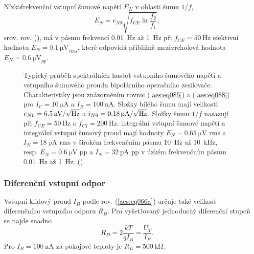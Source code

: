         Nízkofrekvenční vstupní šumové napětí \(E_N\) v oblasti šumu \(1/f\),
        \begin{equation}\label{aes:eq087}
          E_N = e_{N0}\sqrt{f_{CE}\ln{\dfrac{f_2}{f_1}}},
        \end{equation}
        srov. rov. (), má v pásmu frekvencí \SI{0.01}{\Hz} až \SI{1}{\Hz} při \(f_{CE}
        = \SI{50}{\Hz}\) efektivní hodnotu \(E_N = \SI{0.1}{\uV}_{rms}\), které odpovídá přibližně
        mezivrcholová hodnota \(E_N = \SI{0.6}{\uV}_{pp}\).

        \begin{figure}[ht!] %
          \centering
          \caption{Typický průběh spektrálních hustot vstupního šumového napětí a vstupního šumového
                   proudu bipolárního operačního zesilovače. Charakteristiky jsou znázorněním rovnic
                   (\ref{aes:eq085}) a (\ref{aes:eq088}) pro \(I_C = \SI{10}{\uA}\)  a \(I_B =
                   \SI{100}{\nA}\). Složky bílého šumu mají velikosti \(e_{N0} = \SI[parse-numbers =
                   false]{6.5}{\nV\per\sqrt{\Hz}}\) a \(i_{N0} = \SI[parse-numbers =
                   false]{0.18}{\pA\per\sqrt{\Hz}}\). Složky šumu \(1/f\) nasazují při \(f_{CE} =
                   \SI{50}{\Hz}\) a \(f_{CI} = \SI{200}{\Hz}\). integrální vstupní šumové napětí a
                   integrální vstupní šumový proud mají hodnoty \(E_N = \SI{0.65}{\uV}\) rms a \(I_N
                   = \SI{18}{\pA}\) rms v širokém frekvenčním pásmu \SI{10}{\Hz} až \SI{10}{\kHz},
                   resp. \(E_N = \SI{0.6}{\uV}\)  pp a \(I_N = \SI{32}{\pA}\) pp v úzkém frekvenčním
                   pásmu \SI{0.01}{\Hz} až \SI{1}{\Hz}. (\cite[s.~54]{Dostal})}
          \label{aes:fig064}
        \end{figure}

      \subsubsection{Diferenční vstupní odpor}\label{aesIchIIIsecIIIssecXI}  
      Vstupní klidový proud \(I_B\) podle rov. (\ref{aes:eq066a}) určuje také velikost diferenčního
      vstupního odporu \(R_B\). Pro vyšetřovaný jednoduchý diferenční stupeň se najde snadno
      \begin{equation}\label{aes:eq088}
        R_D = 2\dfrac{kT}{qI_B} = \dfrac{U_T}{I_B}.
      \end{equation}
      Pro \(I_B = \SI{100}{\nA}\) za pokojové teploty je \(R_D = \SI{500}{\kilo\ohm}\).
      
